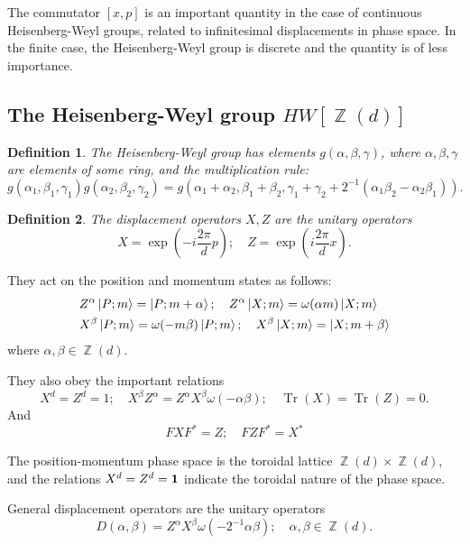 \documentclass[a4paper]{article}
\DeclareMathOperator{\Z}{\mathbb{Z}}
\DeclareMathOperator{\Tr}{Tr}
\newtheorem{definition}{Definition}
\begin{document}
  The commutator $[x,p]$ is an important quantity in the
  case of continuous Heisenberg-Weyl groups, related to
  infinitesimal displacements in phase space. In the finite
  case, the Heisenberg-Weyl group is discrete and the
  quantity is of less importance.

  \subsection{The Heisenberg-Weyl group $HW[\Z(d)]$}

  \begin{definition}
    The Heisenberg-Weyl group has elements
    $g(\alpha,\beta,\gamma)$, where $\alpha, \beta, \gamma$ 
    are elements of some ring, and the multiplication rule:
    \[
      g(\alpha_1,\beta_1,\gamma_1)
      g(\alpha_2,\beta_2,\gamma_2)
      = g(\alpha_1+\alpha_2,\beta_1+\beta_2,
      \gamma_1+\gamma_2+2^{-1}
      (\alpha_1\beta_2-\alpha_2\beta_1)).
    \] 
  \end{definition}

  \begin{definition}
    The displacement operators $X, Z$ are the unitary
    operators
    \[
      X = \exp\left( -i \frac{2\pi}{d} p \right);
      \quad
      Z = \exp\left( i \frac{2\pi}{d} x \right).
    \] 
  \end{definition}

  They act on the position and momentum states as follows:
  \begin{align*}
    &Z^{\alpha} \ket{P; m} = \ket{P; m + \alpha};
    \quad
    Z^{\alpha} \ket{X; m} = \omega(\alpha m) \ket{X; m}\\
    &X^{\beta} \ket{P; m} = \omega(-m\beta) \ket{P; m};
    \quad
    X^{\beta} \ket{X; m} = \ket{X; m+\beta}
  \end{align*}
  where $\alpha, \beta \in \Z(d)$.

  They also obey the important relations
  \[
    X^{d} = Z^{d} = 1;
    \quad
    X^{\beta}Z^{\alpha} =
    Z^{\alpha}X^{\beta}\omega(-\alpha\beta);
    \quad
    \Tr(X) = \Tr(Z) = 0.
  \] 
  And
  \[
    FXF^{*} = Z;
    \quad
    FZF^{*} = X^{*}
  \] 

  The position-momentum phase space is the toroidal lattice
  $\Z(d) \times \Z(d)$, and the relations $X^{d} = Z^{d} =
  \bf 1$ indicate the toroidal nature of the phase space.

  General displacement operators are the unitary operators
  \[
    D(\alpha,\beta)
    = Z^{\alpha} X^{\beta} \omega(-2^{-1}\alpha\beta);
    \quad
    \alpha,\beta \in \Z(d).
  \] 
\end{document}
